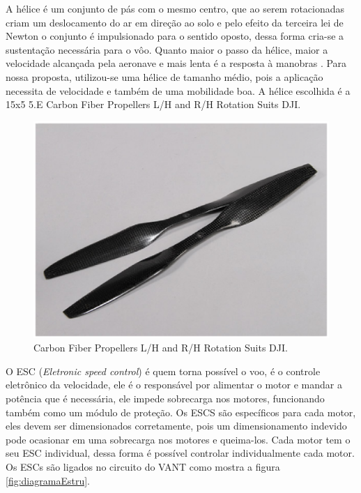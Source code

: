 A hélice é um conjunto de pás com o mesmo centro, que ao serem rotacionadas criam um deslocamento do ar em direção ao solo e pelo efeito da terceira lei de Newton o conjunto é impulsionado para o sentido oposto, dessa forma cria-se a sustentação necessária para o vôo.  Quanto maior o passo da hélice, maior a velocidade alcançada  pela aeronave e mais lenta é a resposta à manobras \cite{VIOLATO}. Para nossa proposta, utilizou-se uma hélice de tamanho médio, pois a aplicação necessita de velocidade e também de uma mobilidade boa. A hélice escolhida é a 15x5 5.E Carbon  Fiber  Propellers  L/H  and  R/H  Rotation  Suits DJI.

\begin{figure}[H]
    \centering
      \includegraphics[keepaspectratio=true,scale=0.5]{figuras/diagramaEstru.eps}
    \caption[Carbon Fiber Propellers L/H and R/H Rotation Suits DJI.]{Carbon Fiber Propellers L/H and R/H Rotation Suits DJI. \cite{pinto}}
    \label{fig:elice}
\end{figure}

O ESC (\textit{Eletronic speed control}) é quem torna possível o voo, é o controle eletrônico da velocidade, ele é o responsável por alimentar o motor e mandar a potência que é necessária, ele impede sobrecarga nos motores, funcionando também como um módulo de proteção. Os ESCS são específicos para cada motor, eles devem ser dimensionados corretamente, pois um dimensionamento indevido pode ocasionar em uma sobrecarga nos motores e queima-los.  Cada motor tem o seu ESC individual, dessa forma é possível controlar individualmente cada motor. Os ESCs são ligados no circuito do VANT como mostra a figura \ref{fig:diagramaEstru}.
 

